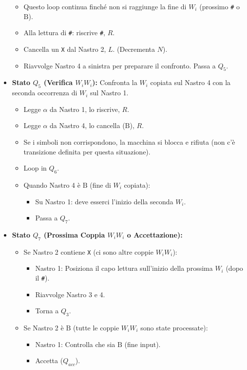 \documentclass[a4paper, 11pt]{book} %
\theoremstyle{definition}
\newcommand{\B}{\text{B}} %
\begin{document}
\begin{itemize}
\begin{itemize}
            \item Questo loop continua finché non si raggiunge la fine di $W_i$ (prossimo \texttt{\#} o $\B$).
            \item Alla lettura di \texttt{\#}: riscrive \texttt{\#}, $R$.
            \item Cancella un \texttt{X} dal Nastro 2, $L$. (Decrementa $N$).
            \item Riavvolge Nastro 4 a sinistra per preparare il confronto. Passa a $Q_5$.
        \end{itemize}
    \item \textbf{Stato $Q_5$ (Verifica $W_i W_i$):}
        Confronta la $W_i$ copiata sul Nastro 4 con la seconda occorrenza di $W_i$ sul Nastro 1.
        \begin{itemize}
            \item Legge $\alpha$ da Nastro 1, lo riscrive, $R$.
            \item Legge $\alpha$ da Nastro 4, lo cancella ($\B$), $R$.
            \item Se i simboli non corrispondono, la macchina si blocca e rifiuta (non c'è transizione definita per questa situazione).
            \item Loop in $Q_6$.
            \item Quando Nastro 4 è $\B$ (fine di $W_i$ copiata):
                \begin{itemize}
                    \item Su Nastro 1: deve esserci l'inizio della seconda $W_i$.
                    \item Passa a $Q_7$.
                \end{itemize}
        \end{itemize}
    \item \textbf{Stato $Q_7$ (Prossima Coppia $W_i W_i$ o Accettazione):}
        \begin{itemize}
            \item Se Nastro 2 contiene \texttt{X} (ci sono altre coppie $W_i W_i$):
                \begin{itemize}
                    \item Nastro 1: Posiziona il capo lettura sull'inizio della prossima $W_i$ (dopo il \texttt{\#}).
                    \item Riavvolge Nastro 3 e 4.
                    \item Torna a $Q_3$.
                \end{itemize}
            \item Se Nastro 2 è $\B$ (tutte le coppie $W_i W_i$ sono state processate):
                \begin{itemize}
                    \item Nastro 1: Controlla che sia $\B$ (fine input).
                    \item Accetta ($Q_{acc}$).
                \end{itemize}
        \end{itemize}
\end{itemize}
\end{document}
